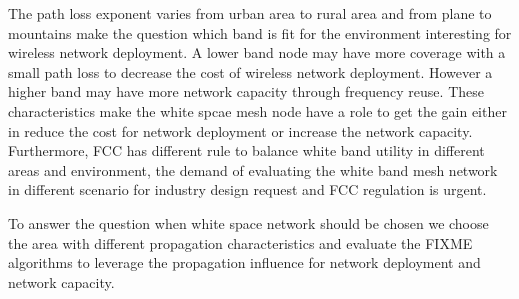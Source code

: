 The path loss exponent varies from urban area to rural area and from plane to mountains make the question which band is fit for the environment interesting for wireless network deployment.
A lower band node may have more coverage with a small path loss to decrease the cost of wireless network deployment. However a higher band may have more network capacity through frequency reuse.
These characteristics make the white spcae mesh node have a role to get the gain either in reduce the cost for network deployment or increase the network capacity.
Furthermore, FCC has different rule to balance white band utility in different areas and environment, the demand of evaluating the white band mesh network in different scenario for industry design request and FCC regulation is urgent.

To answer the question when white space network should be chosen 
we choose the area with different propagation characteristics and evaluate the FIXME algorithms to leverage the propagation influence for network deployment and network capacity.
